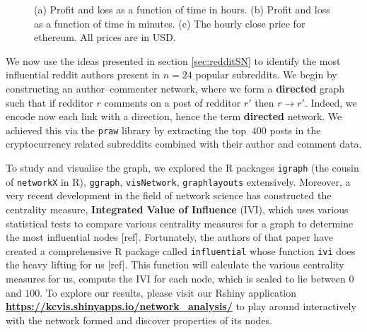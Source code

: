 \documentclass[twoside]{report}
\newcommand{\code}{\texttt}
\begin{document}
\begin{spacing}{1}
\begin{figure}[h]
\caption{(a) Profit and loss as a function of time in hours. (b) Profit and loss as a function of time in minutes. (c) The hourly close price for ethereum. All prices are in USD.}
\label{fig:pnl_naji102}
\end{figure}
We now use the ideas presented in section \ref{sec:redditSN} to identify the most influential reddit authors present in $n=24$ popular subreddits. We begin by constructing an author--commenter network, where we form a \textbf{directed} graph such that if redditor $r$ comments on a post of redditor $r'$ then $r \rightarrow r'$. Indeed, we encode now each link with a direction, hence the term \textbf{directed} network. We achieved this via the \code{praw} library by extracting the top $~400$ posts in the cryptocurrency related subreddits combined with their author and comment data. 



To study and visualise the graph, we explored the R packages \code{igraph} (the cousin of \code{networkX} in R), \code{ggraph}, \code{visNetwork}, \code{graphlayouts} extensively. Moreover, a very recent development in the field of network science has constructed the centrality measure, \textbf{Integrated Value of Influence} (IVI), which uses various statistical tests to compare various centrality measures for a graph to determine the most influential nodes [ref]. Fortunately, the authors of that paper have created a comprehensive R package called \code{influential} whose function \code{ivi} does the heavy lifting for us [ref]. This function will calculate the various centrality measures for us, compute the IVI for each node, which is scaled to lie between $0$ and $100$. To explore our results, please visit our Rshiny application \textbf{\url{https://kcvis.shinyapps.io/network_analysis/}} to play around interactively with the network formed and discover properties of its nodes. 




\end{spacing}
\end{document}
